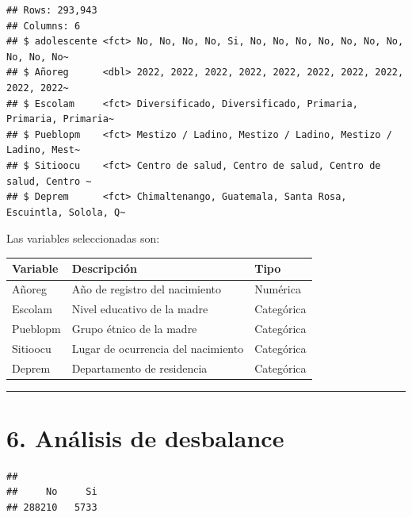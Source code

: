 \documentclass[
]{article}
\newenvironment{Shaded}{\begin{snugshade}}{\end{snugshade}}
\newcommand{\FunctionTok}[1]{\textcolor[rgb]{0.13,0.29,0.53}{\textbf{#1}}}
\newcommand{\NormalTok}[1]{#1}
\newcommand{\OtherTok}[1]{\textcolor[rgb]{0.56,0.35,0.01}{#1}}
\newcommand{\SpecialCharTok}[1]{\textcolor[rgb]{0.81,0.36,0.00}{\textbf{#1}}}
\begin{document}
\begin{verbatim}
## Rows: 293,943
## Columns: 6
## $ adolescente <fct> No, No, No, No, Si, No, No, No, No, No, No, No, No, No, No~
## $ Añoreg      <dbl> 2022, 2022, 2022, 2022, 2022, 2022, 2022, 2022, 2022, 2022~
## $ Escolam     <fct> Diversificado, Diversificado, Primaria, Primaria, Primaria~
## $ Pueblopm    <fct> Mestizo / Ladino, Mestizo / Ladino, Mestizo / Ladino, Mest~
## $ Sitioocu    <fct> Centro de salud, Centro de salud, Centro de salud, Centro ~
## $ Deprem      <fct> Chimaltenango, Guatemala, Santa Rosa, Escuintla, Solola, Q~
\end{verbatim}

Las variables seleccionadas son:

\begin{longtable}[]{@{}lll@{}}
\toprule\noalign{}
Variable & Descripción & Tipo \\
\midrule\noalign{}
\endhead
\bottomrule\noalign{}
\endlastfoot
Añoreg & Año de registro del nacimiento & Numérica \\
Escolam & Nivel educativo de la madre & Categórica \\
Pueblopm & Grupo étnico de la madre & Categórica \\
Sitioocu & Lugar de ocurrencia del nacimiento & Categórica \\
Deprem & Departamento de residencia & Categórica \\
\end{longtable}

\begin{center}\rule{0.5\linewidth}{0.5pt}\end{center}

\section{6. Análisis de desbalance}\label{anuxe1lisis-de-desbalance}

\begin{Shaded}
\end{Shaded}

\begin{verbatim}
## 
##     No     Si 
## 288210   5733
\end{verbatim}
\end{document}
